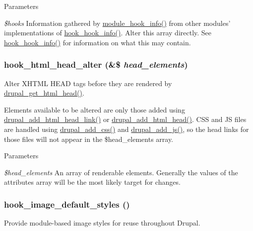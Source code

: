 \begin{DoxyParams}{Parameters}
\item[{\em \$hooks}]Information gathered by \hyperlink{group__hooks_ga30e72b1391cfa4c282fe98e0dabe02f9}{module\_\-hook\_\-info()} from other modules' implementations of \hyperlink{group__hooks_ga65142e7864f445483786087d180a2010}{hook\_\-hook\_\-info()}. Alter this array directly. See \hyperlink{group__hooks_ga65142e7864f445483786087d180a2010}{hook\_\-hook\_\-info()} for information on what this may contain. \end{DoxyParams}
\hypertarget{group__hooks_ga0769a87ac64497be6b87aea2b640839c}{
\subsubsection[{hook\_\-html\_\-head\_\-alter}]{\setlength{\rightskip}{0pt plus 5cm}hook\_\-html\_\-head\_\-alter (\&\$ {\em head\_\-elements})}}
\label{group__hooks_ga0769a87ac64497be6b87aea2b640839c}
Alter XHTML HEAD tags before they are rendered by \hyperlink{common_8inc_acdee011d76859a5a9280209df1175188}{drupal\_\-get\_\-html\_\-head()}.

Elements available to be altered are only those added using \hyperlink{common_8inc_aad501b017775a67b155fe5e441f1ad9d}{drupal\_\-add\_\-html\_\-head\_\-link()} or \hyperlink{common_8inc_a39eab16a83904b845fccc922a0c5c2cf}{drupal\_\-add\_\-html\_\-head()}. CSS and JS files are handled using \hyperlink{common_8inc_a2c5bb2667efb44b02f1a105c0bfdebe5}{drupal\_\-add\_\-css()} and \hyperlink{common_8inc_a623370a2c3c2de0390dab078d17dca02}{drupal\_\-add\_\-js()}, so the head links for those files will not appear in the \$head\_\-elements array.


\begin{DoxyParams}{Parameters}
\item[{\em \$head\_\-elements}]An array of renderable elements. Generally the values of the attributes array will be the most likely target for changes. \end{DoxyParams}
\hypertarget{group__hooks_ga856096251574b0df42813f6aff0d62ab}{
\subsubsection[{hook\_\-image\_\-default\_\-styles}]{\setlength{\rightskip}{0pt plus 5cm}hook\_\-image\_\-default\_\-styles ()}}
\label{group__hooks_ga856096251574b0df42813f6aff0d62ab}
Provide module-\/based image styles for reuse throughout Drupal.

